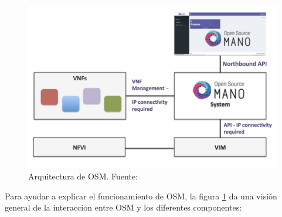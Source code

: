 \clearpage

\begin{figure}[!ht]
	\centering
	\includegraphics[width=0.8\linewidth]{imagenes/osm_arch}
	\caption{Arquitectura de OSM. 
		Fuente: \cite{osmwikibib}}
	\label{fig:osmarch}
\end{figure}

Para ayudar a explicar el funcionamiento de \ac{OSM}, la figura \ref{fig:osmarch} da una visión general de la interaccion entre \ac{OSM} y los diferentes componentes:

